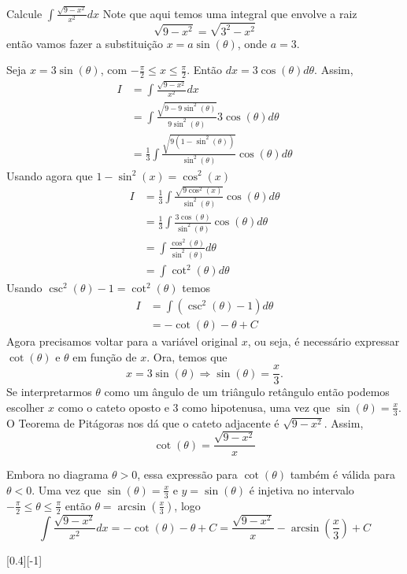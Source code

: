 \begin{example}
  Calcule \(\int \frac{\sqrt{9-x^2}}{x^2}dx\)
  \solution
  Note que aqui temos uma integral que envolve a raiz
  \[
    \sqrt{9-x^2} = \sqrt{3^2-x^2}
  \]
  então vamos fazer a substituição
  $x=a \sin(\theta)$, onde $a=3$.

  Seja $x= 3\sin(\theta)$, com
  \(-\frac{\pi}{2} \leq x \leq \frac{\pi}{2}\).
  Então $dx=3 \cos(\theta) d\theta$.
  Assim,
  \begin{align*}
    I
    & = \int \frac{\sqrt{9-x^2}}{x^2}dx \\
    & = \int \frac{\sqrt{9-9\sin^2(\theta)}}{9 \sin^2(\theta)} 3 \cos(\theta) d\theta \\
    & = \frac{1}{3}\int \frac{\sqrt{9(1-\sin^2(\theta))}}{ \sin^2(\theta)} \cos(\theta) d\theta
  \end{align*}
  Usando agora que
  \(1-\sin^2(x)= \cos^2(x)\)
  \begin{align*}
    I
    & = \frac{1}{3}\int \frac{\sqrt{9\cos^2(x)}}{ \sin^2(\theta)} \cos(\theta) d\theta \\
    & = \frac{1}{3}\int \frac{3\cos(\theta)}{\sin^2(\theta)}\cos(\theta) d\theta  \\
    & = \int \frac{\cos^2(\theta)}{\sin^2(\theta)} d\theta \\
    & = \int \cot^2(\theta) d\theta
  \end{align*}
  Usando
  \(\csc^2(\theta)-1 = \cot^2(\theta)\)
  temos
  \begin{align*}
  I
    & =  \int (\csc^2(\theta)-1) d \theta  \\
    & = -\cot(\theta)- \theta +C
  \end{align*}
  Agora precisamos voltar para a variável original $x$, ou seja, é necessário
  expressar $\cot(\theta)$ e $\theta$ em função de $x$. Ora, temos que
  \[
    x = 3\sin(\theta)
    \Rightarrow
    \sin(\theta) = \frac{x}{3}.
  \]
  Se interpretarmos
  $\theta$ como um ângulo de um triângulo retângulo então podemos escolher $x$
  como o cateto oposto e $3$ como hipotenusa, uma vez que
  \(\sin(\theta)=\frac{x}{3}\).
  O Teorema de Pitágoras nos dá que o cateto adjacente é
  $\sqrt{9-x^2}$. Assim,
  \[
    \cot(\theta)= \frac{\sqrt{9-x^2}}{x}
  \]

  Embora no diagrama $\theta >0$, essa expressão para $\cot(\theta)$ também é
  válida para $\theta <0$. Uma vez que \(\sin(\theta)= \frac{x}{3}\) e
  $y=\sin(\theta)$ é injetiva no intervalo
  \(-\frac{\pi}{2} \leq \theta \leq\frac{\pi}{2}\)
  então \(\theta = \arcsin\left(\frac{x}{3}\right)\), logo
  \[
    \int \frac{\sqrt{9-x^2}}{x^2}dx
    = -\cot(\theta)-\theta+C
    = \frac{\sqrt{9-x^2}}{x}-\arcsin\left(\frac{x}{3}\right)+C
  \]

  [0.4][-1]
\end{example}


